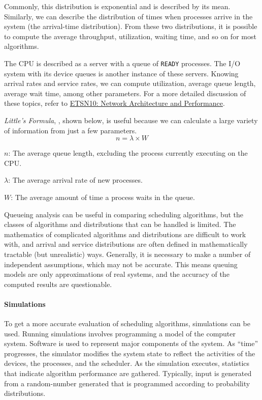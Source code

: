 Commonly, this distribution is exponential and is described by its mean.
Similarly, we can describe the distribution of times when processes arrive in
the system (the arrival-time distribution). From these two distributions, it is
possible to compute the average throughput, utilization, waiting time, and so
on for most algorithms.

The CPU is described as a server with a queue of \texttt{READY} processes.
The I/O system with its device queues is another instance of these servers.
Knowing arrival rates and service rates, we can compute utilization, average queue length, average wait time, among other parameters.
For a more detailed discussion of these topics, refer to \href{file:./ETSN10-Network_Architecture_Performance-Reference_Material.pdf}{ETSN10: Network Architecture and Performance}.

\emph{Little's Formula}, , shown below, is useful because we can calculate a large variety of information from just a few parameters.
\begin{equation}\label{eq:Littles_Law}
  n = \lambda \times W
\end{equation}
\begin{description}[noitemsep]
\item $n$: The average queue length, excluding the process currently executing on the CPU.\@
\item $\lambda$: The average arrival rate of new processes.
\item $W$: The average amount of time a process waits in the queue.
\end{description}

Queueing analysis can be useful in comparing scheduling algorithms, but the classes of algorithms and distributions that can be handled is limited.
The mathematics of complicated algorithms and distributions are difficult to work with, and arrival and service distributions are often defined in mathematically tractable (but unrealistic) ways.
Generally, it is necessary to make a number of independent assumptions, which may not be accurate.
This means queuing models are only approximations of real systems, and the accuracy of the computed results are questionable.

\paragraph{Simulations}\label{par:Simulations}
To get a more accurate evaluation of scheduling algorithms, simulations can be used.
Running simulations involves programming a model of the computer system.
Software is used to represent major components of the system.
As ``time'' progresses, the simulator modifies the system state to reflect the activities of the devices, the processes, and the scheduler.
As the simulation executes, statistics that indicate algorithm performance are gathered.
Typically, input is generated from a random-number generated that is programmed according to probability distributions.

